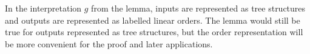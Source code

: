 In the interpretation $g$ from the lemma, inputs are represented as tree structures and  outputs are represented as labelled linear orders. The lemma would still be true for outputs represented as tree structures, but the order representation will be more convenient for the proof and later applications. 



